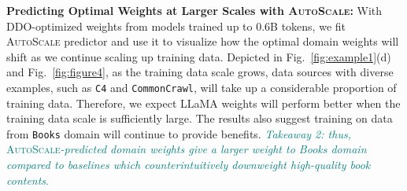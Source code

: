 \documentclass{article} %
\begin{document}
\textbf{Predicting Optimal Weights at Larger Scales with \textsc{AutoScale}:}
With \textsc{DDO}-optimized weights from models trained up to 0.6B tokens, we fit \textsc{AutoScale} predictor and use it to visualize how the optimal domain weights will shift as we continue scaling up training data.
Depicted in Fig.~\ref{fig:example1}(d) and Fig.~\ref{fig:figure4}, as the training data scale grows, data sources with diverse examples, such as \texttt{C4} and \texttt{CommonCrawl}, will take up a considerable proportion of training data. Therefore, we expect LLaMA weights will perform better when the training data scale is sufficiently large. The results also suggest training on data from \texttt{Books} domain will continue to provide benefits. \textcolor{teal}{\textit{Takeaway 2: thus, }\textsc{AutoScale}\textit{-predicted domain weights give a larger weight to Books domain compared to baselines which counterintuitively downweight high-quality book contents}.}
\end{document}

